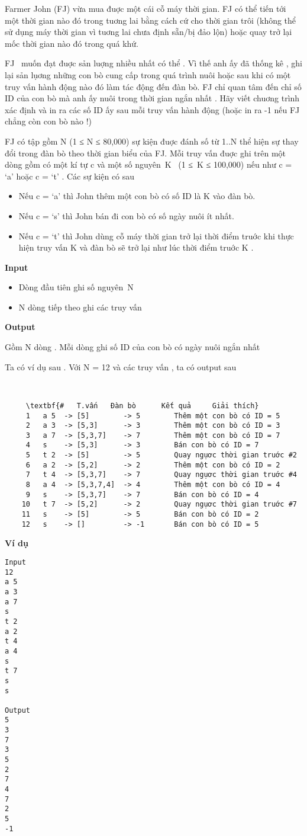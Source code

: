 

Farmer John (FJ) vừa mua đuợc một cái cỗ máy thời gian. FJ có thể tiến tới một thời gian nào đó trong tuơng lai bằng cách cứ cho thời gian trôi (không thể sử dụng máy thời gian vì tuơng lai chưa định sẵn/bị đảo lộn) hoặc quay trở lại mốc thời gian nào đó trong quá khứ.

FJ  muốn đạt đuợc sản luợng nhiều nhất có thể . Vì thế anh ấy đã thống kê , ghi lại sản lụơng những con bò cung cấp trong quá trình nuôi hoặc sau khi có một truy vấn hành động nào đó làm tác động đến đàn bò. FJ chỉ quan tâm đến chỉ số ID của con bò mà anh ấy nuôi trong thời gian ngắn nhất . Hãy viết chuơng trình xác định và in ra các số ID ấy sau mỗi truy vấn hành động (hoặc in ra -1 nếu FJ chẳng còn con bò nào !)

FJ có tập gồm N (1 ≤ N ≤ 80,000) sự kiện đuợc đánh số từ 1..N thể hiện sự thay đổi trong đàn bò theo thời gian biểu của FJ. Mỗi truy vấn đuợc ghi trên một dòng gồm có một kí tự c và một số nguyên K  (1 ≤ K ≤ 100,000) nếu như c = ‘a’ hoặc c = ‘t’ . Các sự kiện có sau
\begin{itemize}
	\item Nếu c = ‘a’ thì John thêm một con bò có số ID là K vào đàn bò.
	\item Nếu c = ‘s’ thì John bán đi con bò có số ngày nuôi ít nhất.
	\item Nếu c = ‘t’ thì John dùng cỗ máy thời gian trở lại thời điểm truớc khi thực hiện truy vấn K và đàn bò sẽ trở lại như lúc thời điểm truớc K .
\end{itemize}

\textbf{Input }
\begin{itemize}
	\item Dòng đầu tiên ghi số nguyên N
	\item N dòng tiếp theo ghi các truy vấn
\end{itemize}

\textbf{Output }

Gồm N dòng . Mỗi dòng ghi số ID của con bò có ngày nuôi ngắn nhất \textbf{}

Ta có ví dụ sau . Với N = 12 và các truy vấn , ta có output sau

 
\begin{verbatim}
     \textbf{#   T.vấn   Đàn bò      Kết quả     Giải thích}
     1   a 5  -> [5]        -> 5        Thêm một con bò có ID = 5
     2   a 3  -> [5,3]      -> 3        Thêm một con bò có ID = 3
     3   a 7  -> [5,3,7]    -> 7        Thêm một con bò có ID = 7
     4   s    -> [5,3]      -> 3        Bán con bò có ID = 7
     5   t 2  -> [5]        -> 5        Quay ngụơc thời gian truớc #2
     6   a 2  -> [5,2]      -> 2        Thêm một con bò có ID = 2
     7   t 4  -> [5,3,7]    -> 7        Quay ngụơc thời gian truớc #4
     8   a 4  -> [5,3,7,4]  -> 4        Thêm một con bò có ID = 4
     9   s    -> [5,3,7]    -> 7        Bán con bò có ID = 4
    10   t 7  -> [5,2]      -> 2        Quay ngụơc thời gian truớc #7
    11   s    -> [5]        -> 5        Bán con bò có ID = 2
    12   s    -> []         -> -1       Bán con bò có ID = 5\end{verbatim}

\textbf{Ví dụ}
\begin{verbatim}
Input
12
a 5
a 3
a 7
s
t 2
a 2
t 4
a 4
s
t 7
s
s

Output
5
3
7
3
5
2
7
4
7
2
5
-1\end{verbatim}
